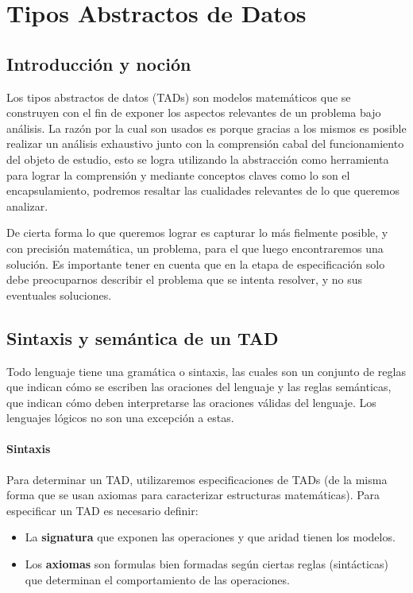 \chapter{Tipos Abstractos de Datos}

\section{Introducci\'on y noci\'on}
Los tipos abstractos de datos (TADs) son modelos matem\'aticos que se construyen con el fin de exponer los aspectos relevantes de un problema bajo an\'alisis. La raz\'on por la cual son usados es porque gracias a los mismos es posible realizar un an\'alisis exhaustivo junto con la comprensi\'on cabal del funcionamiento del objeto de estudio, esto se logra utilizando la abstracci\'on como herramienta para lograr la comprensi\'on y mediante conceptos claves como lo son el encapsulamiento, podremos resaltar las cualidades relevantes de lo que queremos analizar.

De cierta forma lo que queremos lograr es capturar lo m\'as fielmente posible, y con precisi\'on matem\'atica, un problema, para el que luego encontraremos una soluci\'on. Es importante tener en cuenta que en la etapa de especificaci\'on solo debe preocuparnos describir el problema que se intenta resolver, y no sus eventuales soluciones.

\section{Sintaxis y sem\'antica de un TAD}

Todo lenguaje tiene una gram\'atica o sintaxis, las cuales son un conjunto de reglas que indican c\'omo se escriben las oraciones del lenguaje y las reglas sem\'anticas, que indican c\'omo deben interpretarse las oraciones v\'alidas del lenguaje. Los lenguajes l\'ogicos no son una excepci\'on a estas.

\subsubsection*{Sintaxis}

Para determinar un TAD, utilizaremos especificaciones de TADs (de la misma forma que se usan axiomas para caracterizar estructuras matem\'aticas). Para especificar un TAD es necesario definir:

\begin{itemize}
 \item La \textbf{signatura} que exponen las operaciones y que aridad tienen los modelos.
 \item Los \textbf{axiomas} son formulas bien formadas seg\'un ciertas reglas (sint\'acticas) que determinan el comportamiento de las operaciones.
\end{itemize}

